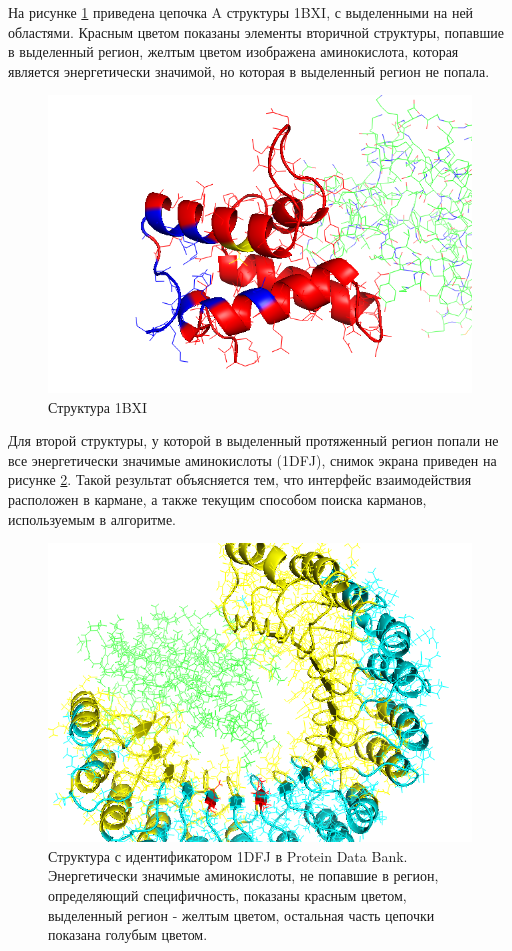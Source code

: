 На рисунке \ref{fig:1BXI} приведена цепочка A структуры 1BXI, с выделенными на ней областями. Красным цветом показаны элементы вторичной структуры, попавшие в выделенный регион, желтым цветом изображена аминокислота, которая является энергетически значимой, но которая в выделенный регион не попала.

\begin{figure}
\includegraphics[width=0.85\linewidth]{1BXI.png}
\caption{\small{Структура 1BXI
 }}
\label{fig:1BXI}

\end{figure}

Для второй структуры, у которой в выделенный протяженный регион попали не все энергетически значимые аминокислоты (1DFJ), снимок экрана приведен на рисунке \ref{fig:1DFJ}. Такой результат объясняется тем, что интерфейс взаимодействия расположен в кармане, а также текущим способом поиска карманов, используемым в алгоритме.


\begin{figure}[h]
\includegraphics[width=\linewidth]{1DFJ.png}

\caption{\small{Структура с идентификатором  1DFJ в Protein Data Bank. Энергетически значимые аминокислоты, не попавшие в регион, определяющий специфичность, показаны красным цветом, выделенный регион - желтым цветом, остальная часть цепочки показана голубым цветом.
 }}
\label{fig:1DFJ}
\end{figure}



